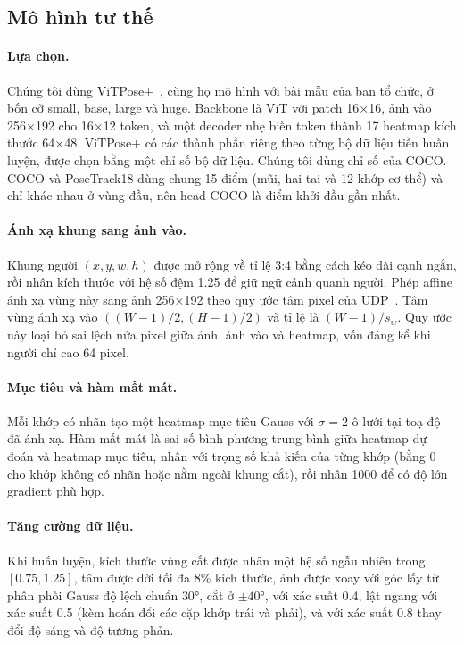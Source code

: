 \documentclass[11pt,a4paper]{article}
\begin{document}
\subsection{Mô hình tư thế}
\label{sec:model}

\paragraph{Lựa chọn.} Chúng tôi dùng ViTPose+~\cite{vitposepp}, cùng họ mô hình với bài mẫu của ban tổ chức, ở bốn cỡ small, base, large và huge. Backbone là ViT với patch 16×16, ảnh vào 256×192 cho 16×12 token, và một decoder nhẹ biến token thành 17 heatmap kích thước 64×48. ViTPose+ có các thành phần riêng theo từng bộ dữ liệu tiền huấn luyện, được chọn bằng một chỉ số bộ dữ liệu. Chúng tôi dùng chỉ số của COCO. COCO và PoseTrack18 dùng chung 15 điểm (mũi, hai tai và 12 khớp cơ thể) và chỉ khác nhau ở vùng đầu, nên head COCO là điểm khởi đầu gần nhất.

\paragraph{Ánh xạ khung sang ảnh vào.} Khung người $(x,y,w,h)$ được mở rộng về tỉ lệ 3:4 bằng cách kéo dài cạnh ngắn, rồi nhân kích thước với hệ số đệm 1.25 để giữ ngữ cảnh quanh người. Phép affine ánh xạ vùng này sang ảnh 256×192 theo quy ước tâm pixel của UDP~\cite{udp}. Tâm vùng ánh xạ vào $((W-1)/2,(H-1)/2)$ và tỉ lệ là $(W-1)/s_w$. Quy ước này loại bỏ sai lệch nửa pixel giữa ảnh, ảnh vào và heatmap, vốn đáng kể khi người chỉ cao 64 pixel.

\paragraph{Mục tiêu và hàm mất mát.} Mỗi khớp có nhãn tạo một heatmap mục tiêu Gauss với $\sigma=2$ ô lưới tại toạ độ đã ánh xạ. Hàm mất mát là sai số bình phương trung bình giữa heatmap dự đoán và heatmap mục tiêu, nhân với trọng số khả kiến của từng khớp (bằng 0 cho khớp không có nhãn hoặc nằm ngoài khung cắt), rồi nhân 1000 để có độ lớn gradient phù hợp.

\paragraph{Tăng cường dữ liệu.} Khi huấn luyện, kích thước vùng cắt được nhân một hệ số ngẫu nhiên trong $[0.75,1.25]$, tâm được dời tối đa 8\% kích thước, ảnh được xoay với góc lấy từ phân phối Gauss độ lệch chuẩn $30°$, cắt ở $\pm40°$, với xác suất 0.4, lật ngang với xác suất 0.5 (kèm hoán đổi các cặp khớp trái và phải), và với xác suất 0.8 thay đổi độ sáng và độ tương phản.
\end{document}

